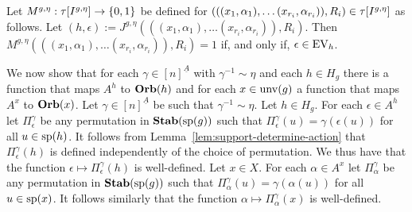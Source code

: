 \documentclass[../main/thesis.tex]{subfiles}
\begin{document}
Let $M^{g, \eta} : \tau[I^{g, \eta}] \rightarrow \{0,1\}$ be defined for
$(((x_1, \alpha_1), \ldots (x_{r_i}, \alpha_{r_i})), R_i) \in
\tau[I^{g, \eta}]$ as follows. Let $(h, \epsilon) := J^{g, \eta}(((x_1,
\alpha_1), \ldots (x_{r_i}, \alpha_{r_i})), R_i)$. Then $M^{g, \eta}(((x_1,
\alpha_1), \ldots (x_{r_i}, \alpha_{r_i})), R_i) = 1$ if, and only if, $\epsilon
\in \text{EV}_h$.

We now show that for each $\gamma \in [n]^{\underline{A}}$ with $\gamma^{-1}
\sim \eta$ and each $h \in H_g$ there is a function that maps $A^h$ to $\text{\textbf{Orb}}(h)$
and for each $x \in \text{unv}(g)$ a function that maps $A^x$ to $\text{\textbf{Orb}}(x)$. Let
$\gamma \in [n]^{\underline{A}}$ be such that $\gamma^{-1} \sim \eta$. Let $h
\in H_g$. For each $\epsilon \in A^{h}$ let $\Pi^{\gamma}_{\epsilon}$ be any
permutation in $\text{\textbf{Stab}} (\text{sp} (g))$ such that $\Pi^{\gamma}_\epsilon (u) = \gamma
(\epsilon(u))$ for all $u \in \text{sp}(h)$. It follows from
Lemma~\ref{lem:support-determine-action} that $\Pi^{\gamma}_\epsilon(h)$ is
defined independently of the choice of permutation. We thus have that the
function $\epsilon \mapsto \Pi^{\gamma}_{\epsilon}(h)$ is well-defined. Let $x
\in X$. For each $\alpha \in A^{x}$ let $\Pi^{\gamma}_{\alpha}$ be any
permutation in $\text{\textbf{Stab}} (\text{sp} (g))$ such that $\Pi^{\gamma}_\alpha (u) = \gamma
(\alpha(u))$ for all $u \in \text{sp}(x)$. It follows similarly that the function
$\alpha \mapsto \Pi^{\gamma}_{\alpha} (x)$ is well-defined.
\end{document}
